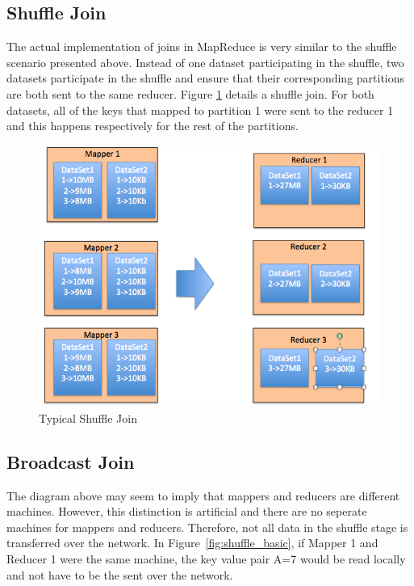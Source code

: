 \subsection{Shuffle Join}
The actual implementation of joins in MapReduce is very similar to the
shuffle scenario presented above. Instead of one dataset participating in the shuffle,
two datasets participate in the shuffle and ensure that their corresponding partitions 
are both sent to the same reducer.  
Figure \ref{fig:shuffle_join} details a shuffle join.
For both datasets, all of the keys that 
mapped to partition 1 were sent to the reducer 1 and this happens respectively for the rest of the partitions.

 \begin{figure}[h]
\begin{center}
\includegraphics[scale=1.0]{./img/shuffle_join.png}
\caption{Typical Shuffle Join}
\label{fig:shuffle_join}
\end{center}
\end{figure}

\subsection {Broadcast Join}
The diagram above  may seem to imply that mappers and reducers
are different machines. However, this distinction is artificial and there are no seperate machines for mappers and reducers. 
Therefore, not all data in the shuffle stage is transferred over the network. In Figure~\ref{fig:shuffle_basic}, if Mapper 1
and Reducer 1 were the same machine, the key value pair A=7 would be read locally and not have to be the sent over the network.

